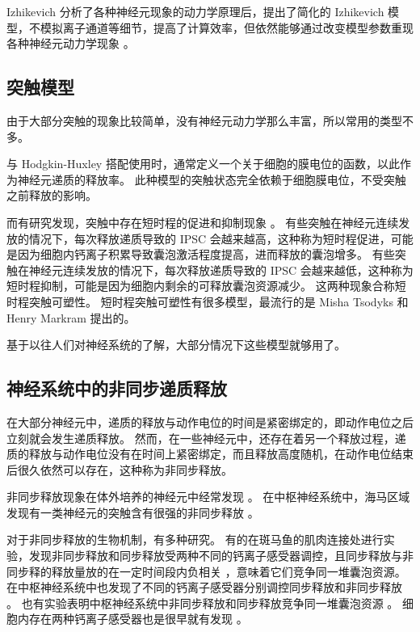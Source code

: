 Izhikevich 分析了各种神经元现象的动力学原理后，提出了简化的 Izhikevich 模型，不模拟离子通道等细节，提高了计算效率，但依然能够通过改变模型参数重现各种神经元动力学现象 \cite{Izhikevich2003,Izhikevich2004}。

\subsection{突触模型}
\label{section:review:synapse-models}
由于大部分突触的现象比较简单，没有神经元动力学那么丰富，所以常用的类型不多。

与 Hodgkin-Huxley 搭配使用时，通常定义一个关于细胞的膜电位的函数，以此作为神经元递质的释放率。
此种模型的突触状态完全依赖于细胞膜电位，不受突触之前释放的影响。

而有研究发现，突触中存在短时程的促进和抑制现象 \cite{Markram1996,Tsodyks1997}。
有些突触在神经元连续发放的情况下，每次释放递质导致的 IPSC 会越来越高，这种称为短时程促进，可能是因为细胞内钙离子积累导致囊泡激活程度提高，进而释放的囊泡增多。
有些突触在神经元连续发放的情况下，每次释放递质导致的 IPSC 会越来越低，这种称为短时程抑制，可能是因为细胞内剩余的可释放囊泡资源减少。
这两种现象合称短时程突触可塑性。
短时程突触可塑性有很多模型，最流行的是 Misha Tsodyks 和 Henry Markram 提出的\cite{Markram1996,Tsodyks1997}。

基于以往人们对神经系统的了解，大部分情况下这些模型就够用了。

\subsection{神经系统中的非同步递质释放}
\label{section:review:asynchronous-neurotransmitter-release-in-the-nervous-system}
在大部分神经元中，递质的释放与动作电位的时间是紧密绑定的，即动作电位之后立刻就会发生递质释放。
然而，在一些神经元中，还存在着另一个释放过程，递质的释放与动作电位没有在时间上紧密绑定，而且释放高度随机，在动作电位结束后很久依然可以存在，这种称为非同步释放。

非同步释放现象在体外培养的神经元中经常发现 \cite{Goda1994,Lau2005}。
在中枢神经系统中，海马区域发现有一类神经元的突触含有很强的非同步释放 \cite{Hefft2005}。

对于非同步释放的生物机制，有多种研究。
有的在斑马鱼的肌肉连接处进行实验，发现非同步释放和同步释放受两种不同的钙离子感受器调控，且同步释放与非同步释的释放量放的在一定时间段内负相关 \cite{Wen2010}，意味着它们竞争同一堆囊泡资源。
在中枢神经系统中也发现了不同的钙离子感受器分别调控同步释放和非同步释放 \cite{Sun2007,Bacaj2013}。
也有实验表明中枢神经系统中非同步释放和同步释放竞争同一堆囊泡资源 \cite{Otsu2004}。
细胞内存在两种钙离子感受器也是很早就有发现 \cite{Zengel1977}。


